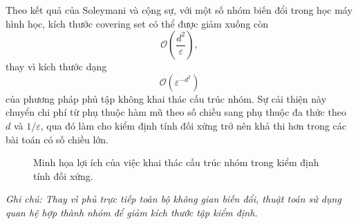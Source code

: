 Theo kết quả của Soleymani và cộng sự, với một số nhóm biến đổi trong học máy hình học, kích thước covering set có thể được giảm xuống còn
\begin{equation}
    \mathcal{O}\left(\frac{d^2}{\varepsilon}\right),
    \label{eq:symmetry-testing-covering-efficient}
\end{equation}
thay vì kích thước dạng
\begin{equation}
    \mathcal{O}\left(\varepsilon^{-d^2}\right)
    \label{eq:symmetry-testing-covering-naive}
\end{equation}
của phương pháp phủ tập không khai thác cấu trúc nhóm. Sự cải thiện này chuyển chi phí từ phụ thuộc hàm mũ theo số chiều sang phụ thuộc đa thức theo $d$ và $1/\varepsilon$, qua đó làm cho kiểm định tính đối xứng trở nên khả thi hơn trong các bài toán có số chiều lớn.

\begin{figure}[H]
    \centering
    
    \caption[Minh họa lợi ích của việc khai thác cấu trúc nhóm]{Minh họa lợi ích của việc khai thác cấu trúc nhóm trong kiểm định tính đối xứng.}
    \label{fig:symmetry-testing-covering}
    
    \vspace{0.15cm}
    \begin{minipage}{0.9\linewidth}
        \centering
    \end{minipage}
\end{figure}
\vspace{-2.0em}
\noindent\textit{Ghi chú: Thay vì phủ trực tiếp toàn bộ không gian biến đổi, thuật toán sử dụng quan hệ hợp thành nhóm để giảm kích thước tập kiểm định.}

